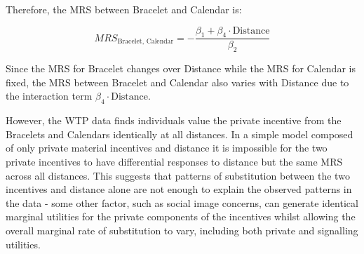 \documentclass{article}
\begin{document}
\begin{prediction}
Therefore, the MRS between Bracelet and Calendar is:

\[
MRS_{\text{Bracelet, Calendar}} = -\frac{\beta_1 + \beta_4 \cdot \text{Distance}}{\beta_2}
\]

Since the MRS for Bracelet changes over Distance while the MRS for Calendar is fixed, 
the MRS between Bracelet and Calendar also varies with Distance due to the interaction 
term $\beta_4 \cdot \text{Distance}$.
\end{prediction}

However, the WTP data finds individuals value the private incentive from the Bracelets 
and Calendars identically 
at all distances. In a simple model composed of only private material incentives and distance 
it is impossible for the two private incentives to have differential responses to distance but the 
same MRS across all distances. This suggests that patterns of substitution between the two incentives 
and distance alone are not enough to explain the observed patterns in the data - some other factor,
such as social image concerns, can generate identical marginal utilities for the 
private components of the incentives whilst allowing the overall marginal rate of 
substitution to vary, including both private and signalling utilities.
\end{document}
